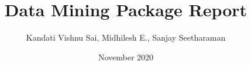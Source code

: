 \documentclass{report}
\title{Data Mining Package Report}
\author{Kandati Vishnu Sai, Midhilesh E., Sanjay Seetharaman}
\date{November 2020}
\begin{document}
\maketitle



\tableofcontents

\setcounter{page}{0}










\nocite{1}\nocite{2}\nocite{3}\nocite{4}\nocite{5}\nocite{6}\nocite{7}


\end{document}
